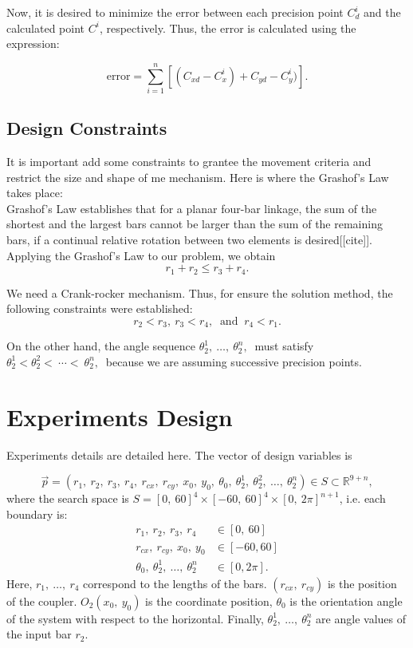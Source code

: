 \documentclass[12pt,letterpape]{article}
\begin{document}
Now, it is desired to minimize the error between each precision point $C^i_d$ and
the calculated point $C^i$, respectively. Thus, the error is calculated using the
expression:

$$
	\text{error} = \sum_{i=1}^n \left[ (C_{xd} - C_x^i) + C_{yd} - C_y^i) \right]. 
$$

% 
\subsection{Design Constraints} %
\label{sub:design_constraints}
It is important add some constraints to grantee the movement criteria and restrict
the size and shape of me mechanism. Here is where the Grashof's Law takes place:\\

Grashof's Law establishes that for a planar four-bar linkage, the sum of the shortest
and the largest bars cannot be larger than the sum of the remaining bars, if a
continual relative rotation between two elements is desired[[cite]]. \\

Applying the Grashof's Law to our problem, we obtain
$$
r_1 + r_2 \leq r_3 + r_4.
$$

We need a Crank-rocker mechanism. Thus, for ensure the solution method, the following constraints were established:
$$
r_2 < r_3, \ r_3 < r_4, \ \text{ and } \ r_4 < r_1.
$$

On the other hand, the angle sequence $\theta_2^1,\ \ldots,\ \theta_2^n,\ $ must satisfy
$ \theta_2^1 < \theta_2^2 <\ \cdots < \ \theta_2^n,\ $ because we are assuming successive precision points.

\section{Experiments Design} %
\label{sec:experiments_design}

Experiments details are detailed here. The vector of design variables is

$$
	\vec{p} = ( r_1,\ r_2,\ r_3,\ r_4,\ r_{cx},\ r_{cy},\ x_0,\ y_0,\ \theta_0,\ \theta_2^1,\ \theta_2^2,\ \ldots,\ \theta_2^n  ) \in S \subset \mathbb{R}^{9+n},
$$
% 
where the search space is $S = [0,\ 60]^4 \times [-60,\ 60]^4 \times [0,\ 2\pi ]^{n+1} $, i.e. each boundary is:
% 
% 
\begin{align*}
       r_1,\ r_2,\ r_3,\ r_4 & \in [0,\ 60]\\
 r_{cx},\ r_{cy},\ x_0,\ y_0 & \in [-60, 60]\\	
\theta_0,\ \theta_2^1,\ \ldots,\ \theta_2^n &\in [0, 2\pi].
\end{align*}
% 
Here, $r_1,\ \ldots,\ r_4$ correspond to the lengths of the bars. $(r_{cx},\ r_{cy})$
is the position of the coupler. $O_2(x_0,\ y_0)$ is the coordinate position,
$\theta_0$ is the orientation angle of the system with respect to the horizontal. Finally, $\theta_2^1,\ \ldots,\ \theta_2^n$ are angle values of the input bar $r_2$.\\
% 
\end{document}
